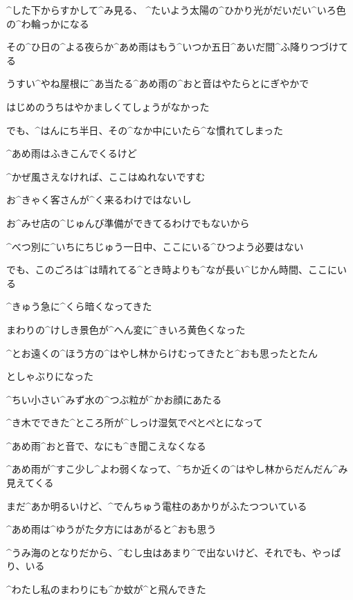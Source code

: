 \Alpha ^{した}{下}からすかして^{み}{見}る、
^{たいよう}{太陽}の^{ひかり}{光}がだいだい^{いろ}{色}の^{わ}{輪}っかになる

\page
\Alpha その^{ひ}{日}の^{よる}{夜}らか^{あめ}{雨}はもう^{いつか}{五日}^{あいだ}{間}^{ふ}{降}りつづけてる

\Alpha うすい^{やね}{屋根}に^{あ}{当}たる^{あめ}{雨}の^{おと}{音}はやたらとにぎやかで

\Alpha はじめのうちはやかましくてしょうがなかった

\Alpha でも、^{はんにち}{半日}、その^{なか}{中}にいたら^{な}{慣}れてしまった

\page
\Alpha ^{あめ}{雨}はふきこんでくるけど

\Alpha ^{かぜ}{風}さえなければ、ここはぬれないですむ

\page
\Alpha お^{きゃく}{客}さんが^{く}{来}るわけではないし

\Alpha お^{みせ}{店}の^{じゅんび}{準備}ができてるわけでもないから

\Alpha ^{べつ}{別}に^{いちにちじゅう}{一日中}、ここにいる^{ひつよう}{必要}はない

\Alpha でも、このごろは^{は}{晴}れてる^{とき}{時}よりも^{なが}{長}い^{じかん}{時間}、ここにいる

\page
\Alpha ^{きゅう}{急}に^{くら}{暗}くなってきた

\Alpha まわりの^{けしき}{景色}が^{へん}{変}に^{きいろ}{黄色}くなった

\page
\Alpha ^{とお}{遠}くの^{ほう}{方}の^{はやし}{林}からけむってきたと^{おも}{思}ったとたん

\Alpha としゃぶりになった

\Alpha ^{ちい}{小}さい^{みず}{水}の^{つぶ}{粒}が^{かお}{顔}にあたる

\page
\Alpha ^{き}{木}でできた^{ところ}{所}が^{しっけ}{湿気}でぺとぺとになって

\Alpha ^{あめ}{雨}^{おと}{音}で、なにも^{き}{聞}こえなくなる

\page[123]
\Alpha ^{あめ}{雨}が^{すこ}{少}し^{よわ}{弱}くなって、^{ちか}{近}くの^{はやし}{林}からだんだん^{み}{見}えてくる

\Alpha まだ^{あか}{明}るいけど、^{でんちゅう}{電柱}のあかりがふたつついている

\Alpha ^{あめ}{雨}は^{ゆうがた}{夕方}にはあがると^{おも}{思}う

\page
\Alpha ^{うみ}{海}のとなりだから、^{むし}{虫}はあまり^{で}{出}ないけど、それでも、やっぱり、いる

\page
\Alpha ^{わたし}{私}のまわりにも^{か}{蚊}が^{と}{飛}んできた

